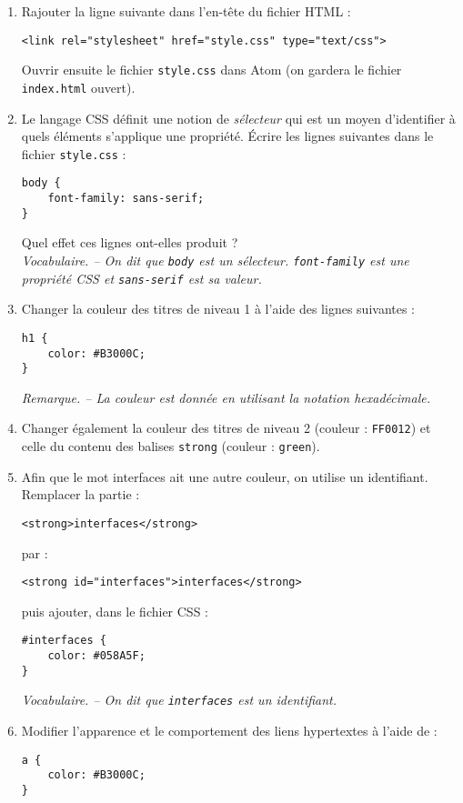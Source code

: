 \documentclass[a4paper]{article}
\begin{document}
\activite
\begin{enumerate}
  \item Rajouter la ligne suivante dans l'en-tête du fichier HTML :
    \begin{verbatim}
<link rel="stylesheet" href="style.css" type="text/css">
    \end{verbatim}
    Ouvrir ensuite le fichier \verb|style.css| dans Atom (on gardera le fichier \verb|index.html| ouvert).
  \item Le langage CSS définit une notion de \textit{sélecteur} qui est un moyen d'identifier à quels éléments s'applique une propriété. Écrire les lignes suivantes dans le fichier \verb|style.css| :
    \begin{verbatim}
body {
    font-family: sans-serif;
}
    \end{verbatim}
    Quel effet ces lignes ont-elles produit ?\\
    \textit{Vocabulaire. -- On dit que \texttt{body} est un sélecteur. \texttt{font-family} est une propriété CSS et \texttt{sans-serif} est sa valeur.}
  \item Changer la couleur des titres de niveau 1 à l'aide des lignes suivantes :
    \begin{verbatim}
h1 {
    color: #B3000C;
}
    \end{verbatim}
    \textit{Remarque. -- La couleur est donnée en utilisant la notation hexadécimale.}
  \item Changer également la couleur des titres de niveau 2 (couleur : \texttt{FF0012}) et celle du contenu des balises \texttt{strong} (couleur : \texttt{green}).
  \item Afin que le mot \og{}interfaces\fg{} ait une autre couleur, on utilise un identifiant. Remplacer la partie :

    \begin{verbatim}
<strong>interfaces</strong>
    \end{verbatim}

    par :

    \begin{verbatim}
<strong id="interfaces">interfaces</strong>
    \end{verbatim}

    puis ajouter, dans le fichier CSS :
    \begin{verbatim}
#interfaces {
    color: #058A5F;
}
    \end{verbatim}
    \textit{Vocabulaire. -- On dit que \texttt{interfaces} est un identifiant.}
  \item Modifier l'apparence et le comportement des liens hypertextes à l'aide de :
    \begin{verbatim}
a {
    color: #B3000C;
}
    \end{verbatim}


\end{enumerate}
\end{document}
